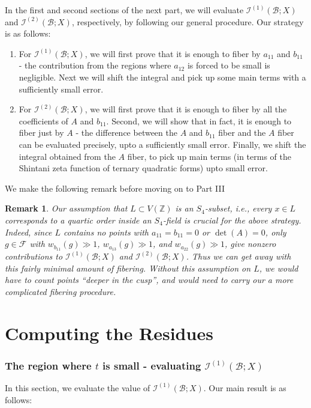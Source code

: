 \documentclass{article}
\def\Z{{\mathbb Z}}
\def\cB{{\mathcal B}}
\def\FF{{\mathcal F}}
\def\Z{{\mathbb Z}}
\def\I{{\mathcal I}}
\newtheorem{remark}[theorem]{Remark}
\begin{document}
In the first and second sections of the next part, we will evaluate 
$\I^{(1)}(\cB;X)$ and $\I^{(2)}(\cB;X)$, respectively, by following our general procedure. Our strategy is as follows:
\begin{enumerate}
\item For $\I^{(1)}(\cB;X)$, we will first prove that it is enough to fiber by $a_{11}$ and $b_{11}$ - the contribution from the regions where $a_{12}$ is forced to be small is negligible. Next we will shift the integral and pick up some main terms with a sufficiently small error.
\item For $\I^{(2)}(\cB;X)$, we will first prove that it is enough to fiber by all the coefficients of $A$ and $b_{11}$. Second, we will show that in fact, it is enough to fiber just by $A$ - the difference between the $A$ and $b_{11}$ fiber and the $A$ fiber can be evaluated precisely, upto a sufficiently small error. Finally, we shift the integral obtained from the $A$ fiber, to pick up main terms (in terms of the Shintani zeta function of ternary quadratic forms) upto small error.
\end{enumerate}

We make the following remark before moving on to Part III
\begin{remark}{\rm 
Our assumption that $L\subset V(\Z)$ is an $S_4$-subset, i.e., every $x\in L$ corresponds to a quartic order inside an $S_4$-field is crucial for the above strategy. Indeed, since $L$ contains no points with $a_{11}=b_{11}=0$ or $\det(A)=0$, only $g\in\FF$ with $w_{b_{11}}(g)\gg 1$, $w_{a_{13}}(g)\gg 1$, and $w_{a_{22}}(g)\gg 1$, give nonzero contributions to $\I^{(1)}(\cB;X)$ and $\I^{(2)}(\cB;X)$. Thus we can get away with this fairly minimal amount of fibering. Without this assumption on $L$, we would have to count points ``deeper in the cusp'', and would need to carry our a more complicated fibering procedure.
}\end{remark}



\part{Computing the Residues}

\section{The region where $t$ is small - evaluating $\I^{(1)}(\cB;X)$}

In this section, we evaluate the value of $\I^{(1)}(\cB;X)$. Our main result is as follows:
\end{document}
